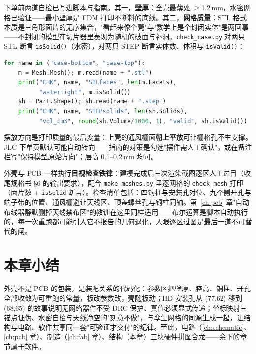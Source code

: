 下单前两道自检已写进脚本与指南。其一，\textbf{壁厚}：全壳最薄处 $\ge$1.2\,mm，水密网格已验证——最小壁厚是 FDM 打印不断料的底线。其二，\textbf{网格质量}：STL 格式本质是三角形面片的无序集合，"看起来像个壳"与"数学上是个封闭实体"是两回事——不封闭的模型在切片器里表现为随机的破面与补洞。\texttt{check\_case.py} 对两只 STL 断言 \texttt{isSolid()}（水密），对两只 STEP 断言实体数、体积与 \texttt{isValid()}：

\begin{lstlisting}[language=Python, basicstyle=\small\ttfamily, breaklines=true,
  caption={check\_case.py：水密与实体有效性自检（全文仅数行）}]
for name in ("case-bottom", "case-top"):
    m = Mesh.Mesh(); m.read(name + ".stl")
    print("CHK", name, "STLfaces", len(m.Facets),
          "watertight", m.isSolid())
    sh = Part.Shape(); sh.read(name + ".step")
    print("CHK", name, "STEPsolids", len(sh.Solids),
          "vol_cm3", round(sh.Volume/1000, 1), "valid", sh.isValid())
\end{lstlisting}

摆放方向是打印质量的最后变量：上壳的通风栅面\textbf{朝上平放}可让栅格孔不生支撑。JLC 下单页默认可能自动转向——指南的对策是勾选"摆件需人工确认"，或在备注栏写"保持模型原始方向"；层高 0.1--0.2\,mm 均可。

外壳与 PCB 一样执行\textbf{目视检查铁律}：建模完成后三次渲染截图逐区人工过目（收尾规格书 \S6 的输出要求），配合 \texttt{make\_meshes.py} 里逐网格的 \texttt{check\_mesh} 打印（面片数 + \texttt{isSolid} 断言）。检查清单包括：四铜柱与安装孔对位、九个侧开孔与端子带的位置、通风栅避让天线区、顶盖螺丝孔与铜柱同轴。第~\ref{ch:pcb} 章"自动布线器静默删掉天线禁布区"的教训在这里同样适用——布尔运算是脚本自动执行的，每一次重跑都可能引入它不报告的几何退化，人眼逐区过图是最后一道不可替代的闸。

\section*{本章小结}
外壳不是 PCB 的包装，是装配关系的代码化：参数区把壁厚、腔高、铜柱、开孔全部收敛为可重跑的常量，板改参数改，壳随板动；HD 安装孔从 (77,62) 移到 (68,65) 的故事说明无网络器件不受 DRC 保护、真值必须显式传递；坐标映射三锚点证伪、水密自检与天线净空的"刻意不做"，与孪生网格的同源生成一起，让结构与电路、软件共享同一套"可验证才交付"的纪律。至此，电路（\ref{ch:schematic}、\ref{ch:pcb} 章）、制造（\ref{ch:fab} 章）、结构（本章）三块硬件拼图合龙——余下的章节属于软件。
